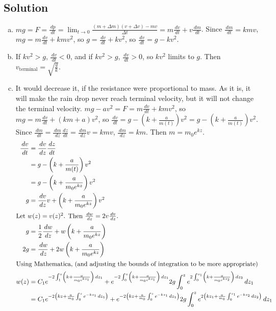 \documentclass[solutions]{esg8012pset}
\renewcommand{\d}{\,d}
\begin{document}
\subsection*{Solution}
  \begin{enumerate}[a)]
    \item $m g = F = \frac{\d p}{\d t} = \lim_{t\rightarrow 0} \frac{(m + \Delta m)(v + \Delta v) - m v}{\Delta t} = m\frac{\d v}{\d t} + v \frac{\d m}{\d t}$.  Since $\frac{\d m}{\d t} = k m v$, $m g = m\frac{\d v}{\d t} + k m v^2$, so $g = \frac{\d v}{\d t} + k v^2$, so $\frac{\d v}{\d t} = g - k v^2$.
    \item If $k v^2 > g$, $\frac{\d v}{\d t} < 0$, and if $k v^2 > g$, $\frac{\d v}{\d t} > 0$, so $k v^2$ limits to $g$.  Then $v_{\text{terminal}} = \sqrt{\frac{g}{k}}$.
    \item It would decrease it, if the resistance were proportional to mass.  As it is, it will make the rain drop never reach terminal velocity, but it will not change the terminal velocity.  $m g - a v^2 = F = m\frac{\d v}{\d t} + k m v^2$, so $m g = m\frac{\d v}{\d t} + (k m + a) v^2$, so $\frac{\d v}{\d t} = g - \left(k + \frac{a}{m(t)}\right) v^2 = g - \left(k + \frac{a}{m(t)}\right) v^2$.  Since $\frac{\d m}{\d t} = \frac{\d m}{\d z}\frac{\d z}{\d t} = \frac{\d m}{\d z}v = k m v$, $\frac{\d m}{\d z} = k m$.  Then $m = m_0 e^{k z}$.  \begin{align*}
   \frac{\d v}{\d t} & = \frac{\d v}{\d z} \frac{\d z}{\d t} \\
    & = g - \left(k + \frac{a}{m(t)}\right) v^2 \\
    & = g - \left(k + \frac{a}{m_0 e^{k z}}\right) v^2 \\
   g & = \frac{\d v}{\d z}v + \left(k + \frac{a}{m_0 e^{k z}}\right) v^2 \\
   \intertext{Let $w(z) = v(z)^2$.  Then $\frac{\d w}{\d z} = 2v\frac{\d v}{\d z}$.}
   g & = \frac{1}{2}\frac{\d w}{\d z} + w\left(k + \frac{a}{m_0 e^{k z}}\right) \\
   2g & = \frac{\d w}{\d z} + 2w\left(k + \frac{a}{m_0 e^{k z}}\right) \\
   \intertext{Using Mathematica, (and adjusting the bounds of integration to be more appropriate)}
   w(z) & = C_1 e^{-2\int_1^z \left(k + \frac{a}{m_0 e^{k z_1}}\right)\d z_1} + e^{-2\int_0^z \left(k + \frac{a}{m_0 e^{k z_1}}\right)\d z_1} 2g\int_0^z e^{2\int_0^{z_1}\left(k + \frac{a}{m_0 e^{k z_2}}\right)\d z_2} \d z_1 \\
    & = C_1 e^{-2\left( k z + \frac{a}{m_0} \int_0^z e^{-k z_1}\d z_1\right)} + e^{-2\left( k z + \frac{a}{m_0}\int_0^z e^{-k z_1}\d z_1\right)} 2g\int_0^z e^{2\left(k z_1 + \frac{a}{m_0}\int_0^{z_1}e^{-k z_2}\d z_2\right)} \d z_1 \\

\end{align*}
\end{enumerate}
\end{document}
